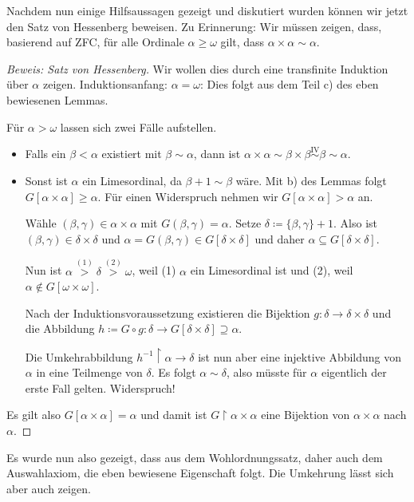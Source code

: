 Nachdem nun einige Hilfsaussagen gezeigt und diskutiert wurden können wir jetzt den Satz von Hessenberg beweisen. Zu Erinnerung: Wir müssen zeigen, dass, basierend auf ZFC, für alle Ordinale $\alpha\geq\omega$ gilt, dass $\alpha\times\alpha\sim\alpha$.
\begin{proof}[Beweis: Satz von Hessenberg]
	Wir wollen dies durch eine transfinite Induktion über $\alpha$ zeigen.
	Induktionsanfang: $\alpha=\omega$: Dies folgt aus dem Teil c) des eben bewiesenen Lemmas.
	
	Für $\alpha>\omega$ lassen sich zwei Fälle aufstellen.
	\begin{itemize}
		\item Falls ein $\beta<\alpha$ existiert mit $\beta\sim\alpha$, dann ist $\alpha\times\alpha\sim\beta\times\beta \stackrel{\text{IV}}{\sim} \beta \sim \alpha$.
		\item Sonst ist $\alpha$ ein Limesordinal, da $\beta+1\sim\beta$ wäre. Mit b) des Lemmas folgt $G[\alpha\times\alpha]\geq\alpha$. Für einen Widerspruch nehmen wir $G[\alpha\times\alpha]>\alpha$ an.
		
		Wähle $(\beta,\gamma)\in\alpha\times\alpha$ mit $G(\beta,\gamma)=\alpha$. Setze $\delta\coloneqq\{\beta,\gamma\}+1$. Also ist $(\beta,\gamma)\in\delta\times\delta$ und $\alpha=G(\beta,\gamma)\in G[\delta\times\delta]$ und daher $\alpha\subseteq G[\delta\times\delta]$.
		
		Nun ist $\alpha\stackrel{(1)}{>}\delta\stackrel{(2)}{>}\omega$, weil (1) $\alpha$ ein Limesordinal ist und (2), weil $\alpha\notin G[\omega\times\omega]$.
		
		Nach der Induktionsvoraussetzung existieren die Bijektion $g:\delta\to\delta\times\delta$ und die Abbildung $h\coloneqq G\circ g : \delta\to G[\delta\times\delta]\supseteq\alpha$.
		
		Die Umkehrabbildung $h^{-1}\upharpoonright\alpha\to\delta$ ist nun aber eine injektive Abbildung von $\alpha$ in eine Teilmenge von $\delta$. Es folgt $\alpha\sim\delta$, also müsste für $\alpha$ eigentlich der erste Fall gelten. Widerspruch!
	\end{itemize}
	
	Es gilt also $G[\alpha\times\alpha]=\alpha$ und damit ist $G\upharpoonright\alpha\times\alpha$ eine Bijektion von $\alpha\times\alpha$ nach $\alpha$.
\end{proof}

Es wurde nun also gezeigt, dass aus dem Wohlordnungssatz, daher auch dem Auswahlaxiom, die eben bewiesene Eigenschaft folgt. Die Umkehrung lässt sich aber auch zeigen.

